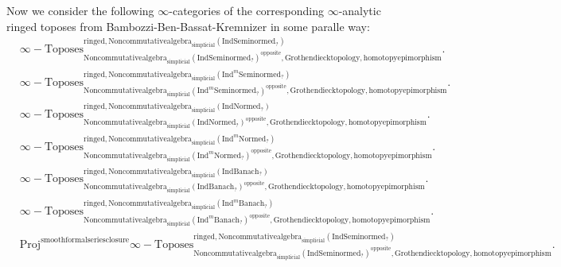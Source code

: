 \documentclass[11pt]{book}
\theoremstyle{definition}
\numberwithin{equation}{section}
\begin{document}
\indent Now we consider the following $\infty$-categories of the corresponding $\infty$-analytic ringed toposes from Bambozzi-Ben-Bassat-Kremnizer \cite{12BBBK} in some paralle way:\\

\begin{align}
&\infty-\mathrm{Toposes}^{\mathrm{ringed},\mathrm{Noncommutativealgebra}_{\mathrm{simplicial}}(\mathrm{Ind}\mathrm{Seminormed}_?)}_{\mathrm{Noncommutativealgebra}_{\mathrm{simplicial}}(\mathrm{Ind}\mathrm{Seminormed}_?)^\mathrm{opposite},\mathrm{Grothendiecktopology,homotopyepimorphism}}.\\
&\infty-\mathrm{Toposes}^{\mathrm{ringed},\mathrm{Noncommutativealgebra}_{\mathrm{simplicial}}(\mathrm{Ind}^m\mathrm{Seminormed}_?)}_{\mathrm{Noncommutativealgebra}_{\mathrm{simplicial}}(\mathrm{Ind}^m\mathrm{Seminormed}_?)^\mathrm{opposite},\mathrm{Grothendiecktopology,homotopyepimorphism}}.\\
&\infty-\mathrm{Toposes}^{\mathrm{ringed},\mathrm{Noncommutativealgebra}_{\mathrm{simplicial}}(\mathrm{Ind}\mathrm{Normed}_?)}_{\mathrm{Noncommutativealgebra}_{\mathrm{simplicial}}(\mathrm{Ind}\mathrm{Normed}_?)^\mathrm{opposite},\mathrm{Grothendiecktopology,homotopyepimorphism}}.\\
&\infty-\mathrm{Toposes}^{\mathrm{ringed},\mathrm{Noncommutativealgebra}_{\mathrm{simplicial}}(\mathrm{Ind}^m\mathrm{Normed}_?)}_{\mathrm{Noncommutativealgebra}_{\mathrm{simplicial}}(\mathrm{Ind}^m\mathrm{Normed}_?)^\mathrm{opposite},\mathrm{Grothendiecktopology,homotopyepimorphism}}.\\
&\infty-\mathrm{Toposes}^{\mathrm{ringed},\mathrm{Noncommutativealgebra}_{\mathrm{simplicial}}(\mathrm{Ind}\mathrm{Banach}_?)}_{\mathrm{Noncommutativealgebra}_{\mathrm{simplicial}}(\mathrm{Ind}\mathrm{Banach}_?)^\mathrm{opposite},\mathrm{Grothendiecktopology,homotopyepimorphism}}.\\
&\infty-\mathrm{Toposes}^{\mathrm{ringed},\mathrm{Noncommutativealgebra}_{\mathrm{simplicial}}(\mathrm{Ind}^m\mathrm{Banach}_?)}_{\mathrm{Noncommutativealgebra}_{\mathrm{simplicial}}(\mathrm{Ind}^m\mathrm{Banach}_?)^\mathrm{opposite},\mathrm{Grothendiecktopology,homotopyepimorphism}}.\\ 
&\mathrm{Proj}^\text{smoothformalseriesclosure}\infty-\mathrm{Toposes}^{\mathrm{ringed},\mathrm{Noncommutativealgebra}_{\mathrm{simplicial}}(\mathrm{Ind}\mathrm{Seminormed}_?)}_{\mathrm{Noncommutativealgebra}_{\mathrm{simplicial}}(\mathrm{Ind}\mathrm{Seminormed}_?)^\mathrm{opposite},\mathrm{Grothendiecktopology,homotopyepimorphism}}. \\

\end{align}
\end{document}

